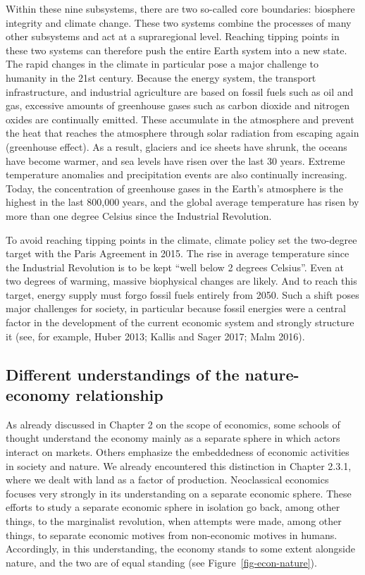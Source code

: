 \documentclass[
  british,
  a4paper,
  DIV=11,
  numbers=noendperiod,
  oneside,
  openany]{scrreprt}
\begin{document}
Within these nine subsystems, there are two so-called core boundaries:
biosphere integrity and climate change. These two systems combine the
processes of many other subsystems and act at a supraregional level.
Reaching tipping points in these two systems can therefore push the
entire Earth system into a new state. The rapid changes in the climate
in particular pose a major challenge to humanity in the 21st century.
Because the energy system, the transport infrastructure, and industrial
agriculture are based on fossil fuels such as oil and gas, excessive
amounts of greenhouse gases such as carbon dioxide and nitrogen oxides
are continually emitted. These accumulate in the atmosphere and prevent
the heat that reaches the atmosphere through solar radiation from
escaping again (greenhouse effect). As a result, glaciers and ice sheets
have shrunk, the oceans have become warmer, and sea levels have risen
over the last 30 years. Extreme temperature anomalies and precipitation
events are also continually increasing. Today, the concentration of
greenhouse gases in the Earth's atmosphere is the highest in the last
800,000 years, and the global average temperature has risen by more than
one degree Celsius since the Industrial Revolution.

To avoid reaching tipping points in the climate, climate policy set the
two-degree target with the Paris Agreement in 2015. The rise in average
temperature since the Industrial Revolution is to be kept ``well below 2
degrees Celsius''. Even at two degrees of warming, massive biophysical
changes are likely. And to reach this target, energy supply must forgo
fossil fuels entirely from 2050. Such a shift poses major challenges for
society, in particular because fossil energies were a central factor in
the development of the current economic system and strongly structure it
(see, for example, Huber 2013; Kallis and Sager 2017; Malm 2016).

\subsection{Different understandings of the nature-economy
relationship}\label{different-understandings-of-the-nature-economy-relationship}

As already discussed in Chapter 2 on the scope of economics, some
schools of thought understand the economy mainly as a separate sphere in
which actors interact on markets. Others emphasize the embeddedness of
economic activities in society and nature. We already encountered this
distinction in Chapter 2.3.1, where we dealt with land as a factor of
production. Neoclassical economics focuses very strongly in its
understanding on a separate economic sphere. These efforts to study a
separate economic sphere in isolation go back, among other things, to
the marginalist revolution, when attempts were made, among other things,
to separate economic motives from non-economic motives in humans.
Accordingly, in this understanding, the economy stands to some extent
alongside nature, and the two are of equal standing (see
Figure~\ref{fig-econ-nature}).
\end{document}
